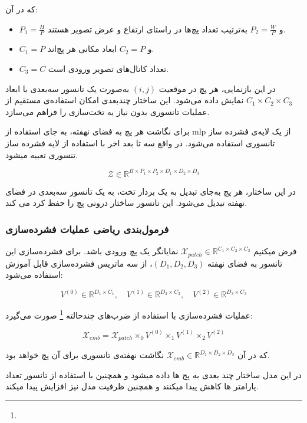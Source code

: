 که در آن:

\begin{itemize}
	\item $P_1 = \frac{H}{P}$ و $P_2 = \frac{W}{P}$ به‌ترتیب تعداد پچ‌ها در راستای ارتفاع و عرض تصویر هستند.
	\item $C_1 = P$ و $C_2 = P$ ابعاد مکانی هر پچ‌اند.
	\item $C_3 = C$ تعداد کانال‌های تصویر ورودی است.
\end{itemize}

در این بازنمایی، هر پچ در موقعیت $(i,j)$ به‌صورت یک تانسور سه‌بعدی با ابعاد $C_1 \times C_2 \times C_3$ نمایش داده می‌شود. این ساختار چندبعدی امکان استفاده‌ی مستقیم از عملیات تانسوری بدون نیاز به تخت‌سازی را فراهم می‌سازد.



برای نگاشت هر پچ به فضای نهفته، به جای استفاده از mlp  از یک لایه‌ی فشرده ساز تانسوری  استفاده می‌شود. در واقع سه تا بعد اخر با استفاده از لایه فشرده ساز تنسوری تعبیه میشود.

\[
\mathcal{Z} \in \mathbb{R}^{B \times P_1 \times P_2 \times D_1 \times D_2 \times D_3}
\]

در این ساختار، هر پچ به‌جای تبدیل به یک بردار تخت، به یک تانسور سه‌بعدی در فضای نهفته تبدیل می‌شود. این تانسور ساختار درونی پچ را حفظ کرد می کند. 

\subsubsection*{فرمول‌بندی ریاضی عملیات فشرده‌سازی}

فرض میکنیم  $\mathcal{X}_{patch} \in \mathbb{R}^{C_1 \times C_2 \times C_3}$ نمایانگر یک پچ ورودی باشد. برای فشرده‌سازی این تانسور به فضای نهفته $(D_1, D_2, D_3)$، از سه ماتریس فشرده‌سازی قابل آموزش استفاده می‌شود:

\[
V^{(0)} \in \mathbb{R}^{D_1 \times C_1}, \quad
V^{(1)} \in \mathbb{R}^{D_2 \times C_2}, \quad
V^{(2)} \in \mathbb{R}^{D_3 \times C_3}
\]

عملیات فشرده‌سازی با استفاده از ضرب‌های چندحالته \footnote{} صورت می‌گیرد:

\[
\mathcal{X}_{emb} = \mathcal{X}_{patch} \times_0 V^{(0)} \times_1 V^{(1)} \times_2 V^{(2)}
\]

که در آن $\mathcal{X}_{emb} \in \mathbb{R}^{D_1 \times D_2 \times D_3}$ نگاشت نهفته‌ی تانسوری برای آن پچ خواهد بود.

در این مدل ساختار چند بعدی به پج ها داده میشود و همچنین با استفاده از تانسور تعداد پارامتر ها کاهش پیدا میکنند و همچنین ظرفیت مدل نیز افزایش پیدا میکند.




